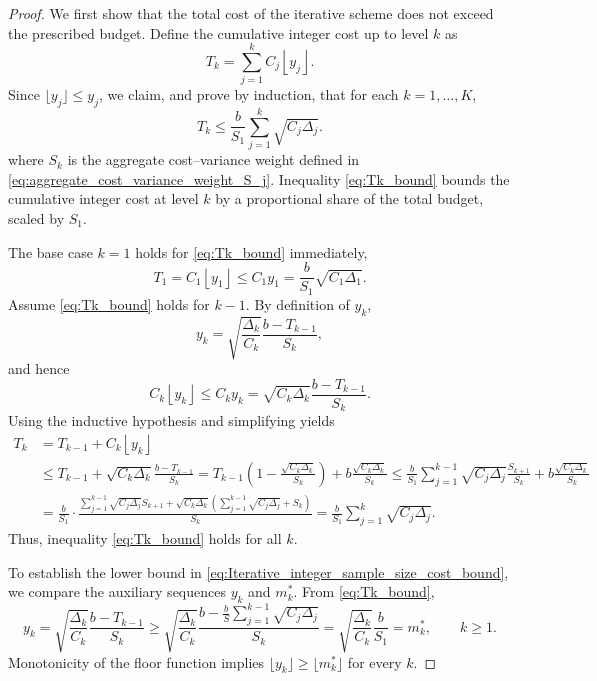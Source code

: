 \begin{proof}
We first show that the total cost of the iterative scheme does not exceed the prescribed budget. Define the cumulative integer cost up to level $k$ as
\[
T_k = \sum_{j=1}^k C_j\left\lfloor y_j \right\rfloor.
\]
Since $\lfloor y_j \rfloor \le y_j$, we claim, and prove by induction, that for each $k = 1, \ldots, K$,
\begin{equation}\label{eq:Tk_bound}
T_k \le \frac{b}{S_1}\sum_{j=1}^k \sqrt{C_j \Delta_j}.
\end{equation}
where $S_k$ is the aggregate cost–variance weight defined in \eqref{eq:aggregate_cost_variance_weight_S_j}. 
Inequality \eqref{eq:Tk_bound} bounds the cumulative integer cost at level $k$ by a proportional share of the total budget, scaled by $S_1$.


The base case $k=1$ holds for \eqref{eq:Tk_bound} immediately,
\[
T_1=C_1 \left\lfloor y_1 \right\rfloor \le C_1y_1 = \frac{b}{S_1}\sqrt{C_1\Delta_1}.
\]
Assume \eqref{eq:Tk_bound} holds for \(k-1\). By definition of \(y_k\),
%
\[
y_k = \sqrt{\frac{\Delta_k}{C_k}}\frac{b - T_{k-1}}{S_k},
\]
%
and hence
%
\[
C_k \left\lfloor y_k \right\rfloor \le C_k y_k  = \sqrt{C_k\Delta_k}\frac{b-T_{k-1}}{S_k}.
\]
%
Using the inductive hypothesis and simplifying yields
\begin{align*}
    T_k &= T_{k-1}+C_k\left\lfloor y_k \right\rfloor \\
    &\le T_{k-1} + \sqrt{C_k\Delta_k}\frac{b-T_{k-1}}{S_k}
    =T_{k-1}\left(1-\frac{\sqrt{C_k\Delta_k}}{S_k}\right) + b\frac{\sqrt{C_k\Delta_k}}{S_k}
    \le \frac{b}{S_1}\sum_{j=1}^{k-1} \sqrt{C_j\Delta_j}\frac{S_{k+1}}{S_k}+b\frac{\sqrt{C_k\Delta_k}}{S_k}\\
    &=\frac{b}{S_1}\cdot \frac{\sum_{j=1}^{k-1} \sqrt{C_j\Delta_j}S_{k+1}+\sqrt{C_k\Delta_k}\left(\sum_{j=1}^{k-1}\sqrt{C_j\Delta_j}+S_k\right)}{S_k}
    =\frac{b}{S_1}\sum_{j=1}^k\sqrt{C_j\Delta_j}.
\end{align*}
%
Thus, inequality \eqref{eq:Tk_bound} holds for all $k$. 

To establish the lower bound in \eqref{eq:Iterative_integer_sample_size_cost_bound}, we compare the auxiliary sequences $y_k$ and $m_k^*$. From \eqref{eq:Tk_bound},
%
\[
y_k = \sqrt{\frac{\Delta_k}{C_k}}\frac{b - T_{k-1}}{S_k} \ge \sqrt{\frac{\Delta_k}{C_k}}\frac{b-\frac{b}{S}\sum_{j=1}^{k-1}\sqrt{C_j\Delta_j}}{S_k} = \sqrt{\frac{\Delta_k}{C_k}}\frac{b}{S_1}=m_k^*, \qquad k \ge 1.
\]
% 
Monotonicity of the floor function implies \(\lfloor y_k\rfloor\ge\lfloor m_k^*\rfloor\) for every \(k\). 

\end{proof}


